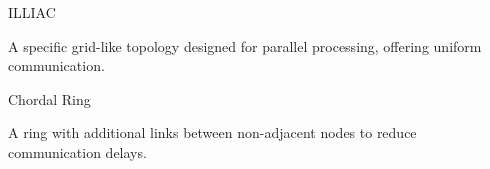 \documentclass[a4paper, 10pt]{book}
\begin{document}
                    \vspace{0.3cm}
                    \noindent
                    \begin{minipage}{0.49\linewidth}
                        \begin{tcolorbox}[colframe=black!50, colback=white, size=small]
                            
                            {\bold ILLIAC}
                            
                            A specific grid-like topology designed for parallel processing, offering uniform communication.

                            \begin{center}
                                \begin{tikzpicture}

                                    
                                    
                                \end{tikzpicture}
                            \end{center}

                        \end{tcolorbox}
                    \end{minipage}
                    \hfill
                    \begin{minipage}{0.49\linewidth}
                        \begin{tcolorbox}[colframe=black!50, colback=white, size=small]
                            
                            {\bold Chordal Ring}
                            
                            A ring with additional links between non-adjacent nodes to reduce communication delays.

                            \begin{center}
                                \begin{tikzpicture}

                                    
                                    
                                \end{tikzpicture}
                            \end{center}

                        \end{tcolorbox}
                    \end{minipage}
                    
\end{document}
